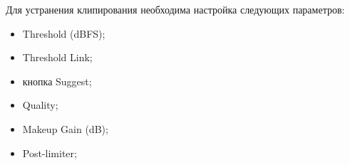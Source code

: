 \documentclass{beamer}
\begin{document}
\begin{frame}
Для устранения клипирования необходима настройка следующих параметров:
\begin{itemize}
  \item Threshold (dBFS); 
  \item Threshold Link; 
  \item кнопка Suggest;
  \item Quality;
  \item Makeup Gain (dB);
  \item Post-limiter;
\end{itemize}
\end{frame}
\end{document}
